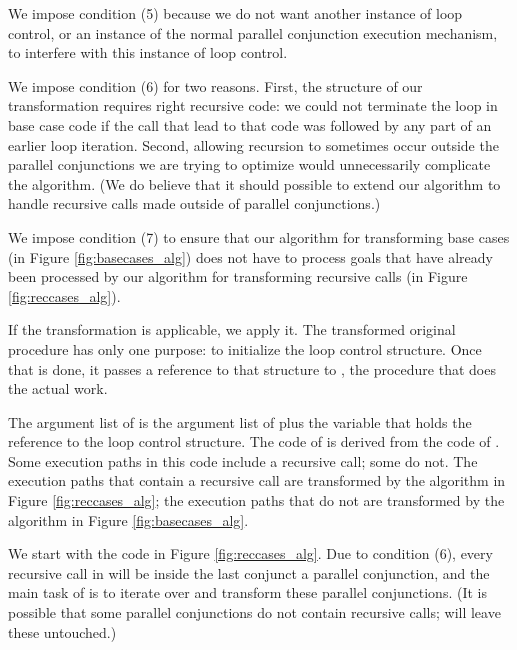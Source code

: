We impose condition (5) because we do not want another instance of loop control,
or an instance of the normal parallel conjunction execution mechanism,
to interfere with this instance of loop control.

We impose condition (6) for two reasons.
First, the structure of our transformation requires right recursive code:
we could not terminate the loop in base case code
if the call that lead to that code
was followed by any part of an earlier loop iteration.
Second, allowing recursion to sometimes occur
outside the parallel conjunctions we are trying to optimize
would unnecessarily complicate the algorithm.
(We do believe that it should possible to extend our algorithm
to handle recursive calls made outside of parallel conjunctions.)


We impose condition (7) to ensure that
our algorithm for transforming base cases
(in Figure \ref{fig:basecases_alg})
does not have to process goals that have already been processed
by our algorithm for transforming recursive calls
(in Figure \ref{fig:reccases_alg}).

If the transformation is applicable, we apply it.
The transformed original procedure has only one purpose:
to initialize the loop control structure.
Once that is done, it passes a reference to that structure to ,
the procedure that does the actual work.

The argument list of 
is the argument list of 
plus the \LC variable that holds the reference to the loop control structure.
The code of  is derived from the code of .
Some execution paths in this code include a recursive call; some do not.
The execution paths that contain a recursive call
are transformed by the algorithm in Figure \ref{fig:reccases_alg};
the execution paths that do not
are transformed by the algorithm in Figure \ref{fig:basecases_alg}.

We start with the code in Figure \ref{fig:reccases_alg}.
Due to condition (6),
every recursive call in 
will be inside the last conjunct a parallel conjunction,
and the main task of \createloopgoal
is to iterate over and transform these parallel conjunctions.
(It is possible that some parallel conjunctions do not contain recursive calls;
\createloopgoal will leave these untouched.)

